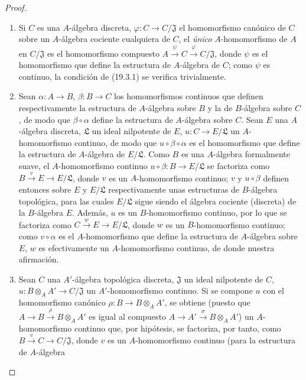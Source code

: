 \begin{proof}
\begin{enumerate}
  \item[(i)] Si $C$ es una $A$-álgebra discreta,
  $\varphi:C\to C/\mathfrak J$ el homomorfismo canónico de $C$ sobre un
  $A$-álgebra cociente cualquiera de $C$, el \emph{único} $A$-homomorfismo
  de $A$ en $C/\mathfrak J$ es el homomorfismo compuesto
  $A\xrightarrow{\psi}C\xrightarrow{\varphi}C/\mathfrak J$, donde
  $\psi$ es el homomorfismo que define la estructura de $A$-álgebra de
  $C$; como $\psi$ es continuo, la condición de (19.3.1) se verifica
  trivialmente.
  \item[(ii)] Sean $\alpha:A\to B$, $\beta:B\to C$ los homomorfismos
  continuos que definen respectivamente la estructura de $A$-álgebra sobre $B$ y
  la de $B$-álgebra sobre $C$, de modo que $\beta\circ\alpha$ define la
  estructura de $A$-álgebra sobre $C$. Sean $E$ una $A$-álgebra discreta,
  $\mathfrak L$ un ideal nilpotente de $E$, $u:C\to E/\mathfrak L$ un
  $A$-homomorfismo continuo, de modo que $u\circ\beta\circ\alpha$ es
  el homomorfismo que define la estructura de $A$-álgebra de
  $E/\mathfrak L$. Como $B$ es una $A$-álgebra formalmente suave, el
  $A$-homomorfismo continuo $u\circ\beta:B\to E/\mathfrak L$ se
  factoriza como $B\xrightarrow{v}E\to E/\mathfrak L$, donde $v$ es un
  $A$-homomorfismo continuo; $v$ y $u\circ\beta$ definen entonces sobre
  $E$ y $E/\mathfrak L$ respectivamente unas estructuras de $B$-álgebra
  topológica, para las cuales $E/\mathfrak L$ sigue siendo 
el álgebra cociente
  (discreta) de la $B$-álgebra $E$. Además, $u$ es un $B$-homomorfismo
  continuo, por lo que se factoriza como $C\xrightarrow{w}E\to E/\mathfrak L$,
  donde $w$ es un $B$-homomorfismo continuo; como
  $v\circ\alpha$ es el $A$-homomorfismo que define la estructura de
  $A$-álgebra sobre $E$, $w$ es efectivamente un $A$-homomorfismo continuo, de donde nuestra
  afirmación.
  \item[(iii)] Sean $C$ una $A'$-álgebra topológica discreta,
  $\mathfrak J$ un ideal nilpotente de $C$,
  $u:B\otimes_A A'\to C/\mathfrak J$ un $A'$-homomorfismo continuo. Si se
  compone $u$ con el homomorfismo canónico
  $\rho:B\to B\otimes_A A'$, se obtiene (puesto que
  $A\to B\xrightarrow{\rho}B\otimes_A A'$ es igual al compuesto
  $A\to A'\xrightarrow{\sigma}B\otimes_A A'$) un $A$-homomorfismo
  continuo que, por hipótesis, se factoriza, por tanto, como
  $B\xrightarrow{v}C\to C/\mathfrak J$, donde $v$ es un $A$-homomorfismo
  continuo (para la estructura de $A$-álgebra

\end{enumerate}
\end{proof}
